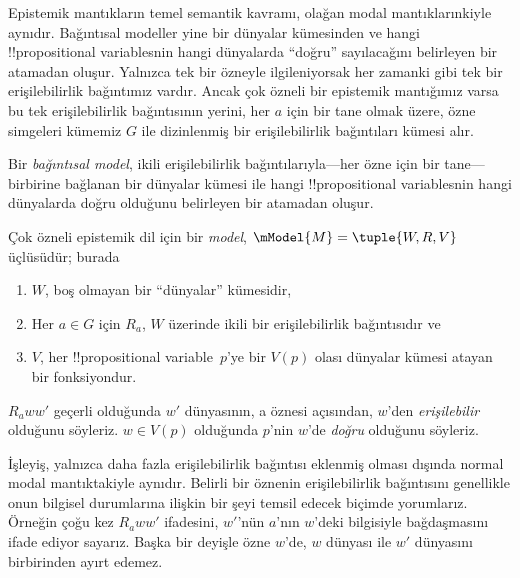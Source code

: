 \documentclass[../../../include/open-logic-section]{subfiles}
\begin{document}


Epistemik mantıkların temel semantik kavramı, olağan modal mantıklarınkiyle
aynıdır. Bağıntısal modeller yine bir dünyalar kümesinden ve hangi
!!{propositional variable}s{}nin hangi dünyalarda ``doğru'' sayılacağını
belirleyen bir atamadan oluşur. Yalnızca tek bir özneyle ilgileniyorsak her
zamanki gibi tek bir erişilebilirlik bağıntımız vardır. Ancak çok özneli bir
epistemik mantığımız varsa bu tek erişilebilirlik bağıntısının yerini, her
$a$ için bir tane olmak üzere, özne simgeleri kümemiz $G$ ile dizinlenmiş bir
erişilebilirlik bağıntıları kümesi alır.

Bir \emph{bağıntısal model}, ikili erişilebilirlik bağıntılarıyla---her özne
için bir tane---birbirine bağlanan bir dünyalar kümesi ile hangi
!!{propositional variable}s{}nin hangi dünyalarda doğru olduğunu belirleyen bir
atamadan oluşur.

\begin{defn}
  Çok özneli epistemik dil için bir \emph{model}, $\mModel{M} = \tuple{W, R,
  V}$ üçlüsüdür; burada
  \begin{enumerate}
  \item $W$, boş olmayan bir ``dünyalar'' kümesidir,
  \item Her $a \in G$ için ${R}_a$, $W$ üzerinde ikili bir erişilebilirlik
  bağıntısıdır ve
  \item $V$, her !!{propositional variable}~$p$'ye bir $V(p)$ olası dünyalar
  kümesi atayan bir fonksiyondur.
  \end{enumerate}
  $R_a ww'$ geçerli olduğunda $w'$ dünyasının, a öznesi açısından,
  $w$'den \emph{erişilebilir} olduğunu söyleriz. $w \in V(p)$ olduğunda
  $p$'nin $w$'de \emph{doğru} olduğunu söyleriz.
\end{defn}

İşleyiş, yalnızca daha fazla erişilebilirlik bağıntısı eklenmiş olması dışında
normal modal mantıktakiyle aynıdır. Belirli bir öznenin erişilebilirlik
bağıntısını genellikle onun bilgisel durumlarına ilişkin bir şeyi temsil
edecek biçimde yorumlarız. Örneğin çoğu kez $R_a ww'$ ifadesini, $w'$'nün
$a$'nın $w$'deki bilgisiyle bağdaşmasını ifade ediyor sayarız. Başka bir
deyişle özne $w$'de, $w$ dünyası ile $w'$ dünyasını birbirinden ayırt edemez.
\end{document}
